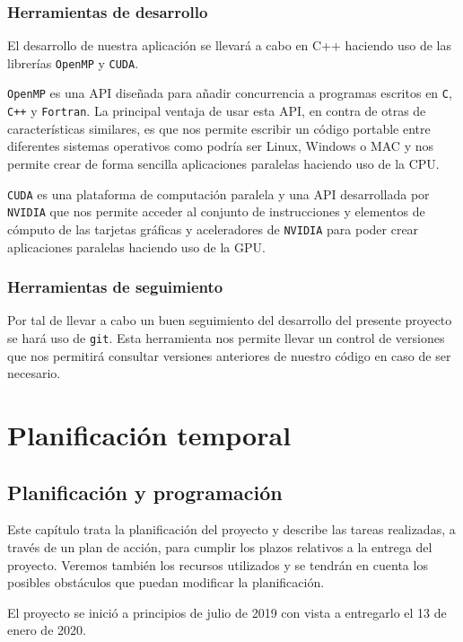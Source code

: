 \documentclass[titlepage,12pt]{report}
\begin{document}
\subsection{Herramientas de desarrollo}

El desarrollo de nuestra aplicación se llevará a cabo en C++ haciendo uso de las librerías \texttt{OpenMP} y \texttt{CUDA}. 

\texttt{OpenMP} es una API diseñada para añadir concurrencia a programas escritos en \texttt{C}, \texttt{C++} y \texttt{Fortran}. La principal ventaja de usar esta API, en contra de otras de características similares, es que nos permite escribir un código portable entre diferentes sistemas operativos como podría ser Linux, Windows o MAC y nos permite crear de forma sencilla aplicaciones paralelas haciendo uso de la CPU.

\texttt{CUDA} es una plataforma de computación paralela y una API desarrollada por \texttt{NVIDIA} que nos permite acceder al conjunto de instrucciones y elementos de cómputo de las tarjetas gráficas y aceleradores de \texttt{NVIDIA} para poder crear aplicaciones paralelas haciendo uso de la GPU.

\subsection{Herramientas de seguimiento}

Por tal de llevar a cabo un buen seguimiento del desarrollo del presente proyecto se hará uso de \texttt{git}. Esta herramienta nos permite llevar un control de versiones que nos permitirá consultar versiones anteriores de nuestro código en caso de ser necesario.

\chapter{Planificación temporal}

\section{Planificación y programación}

Este capítulo trata la planificación del proyecto y describe las tareas realizadas, a través de un plan de acción, para cumplir los plazos relativos a la entrega del proyecto. Veremos también los recursos utilizados y se tendrán en cuenta los posibles obstáculos que puedan modificar la planificación.

El proyecto se inició a principios de julio de 2019 con vista a entregarlo el 13 de enero de 2020.
\end{document}
